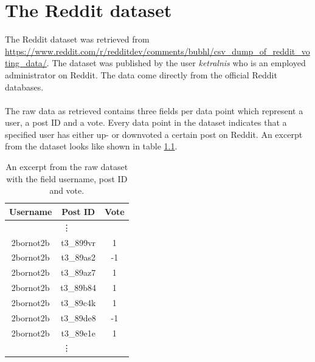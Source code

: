 \chapter{The Reddit dataset}\label{appendix:reddit}
The Reddit dataset was retrieved from \url{https://www.reddit.com/r/redditdev/comments/bubhl/csv_dump_of_reddit_voting_data/}. The dataset was published by the user \textit{ketralnis} who is an employed administrator on Reddit. The data come directly from the official Reddit databases.
\\\\
The raw data as retrieved contains three fields per data point which represent a user, a post ID and a vote. Every data point in the dataset indicates that a specified user has either up- or downvoted a certain post on Reddit. An excerpt from the dataset looks like shown in table \ref{table:reddit_raw_excerpt}.
\begin{table}[h!]
    \centering
    \begin{tabular}{ c c c } 
        \hline
        \textbf{Username} & \textbf{Post ID} & \textbf{Vote} \\
        \hline
        \multicolumn{3}{c}{\vdots} \\
        2bornot2b & t3\_899vr & 1 \\
        2bornot2b & t3\_89as2 & -1 \\
        2bornot2b & t3\_89az7 & 1 \\
        2bornot2b & t3\_89b84 & 1 \\
        2bornot2b & t3\_89c4k & 1 \\
        2bornot2b & t3\_89de8 & -1 \\
        2bornot2b & t3\_89e1e & 1 \\
        \multicolumn{3}{c}{\vdots} \\
    \end{tabular}
    \caption{An excerpt from the raw dataset with the field username, post ID and vote.}
    \label{table:reddit_raw_excerpt}
\end{table}
\\
